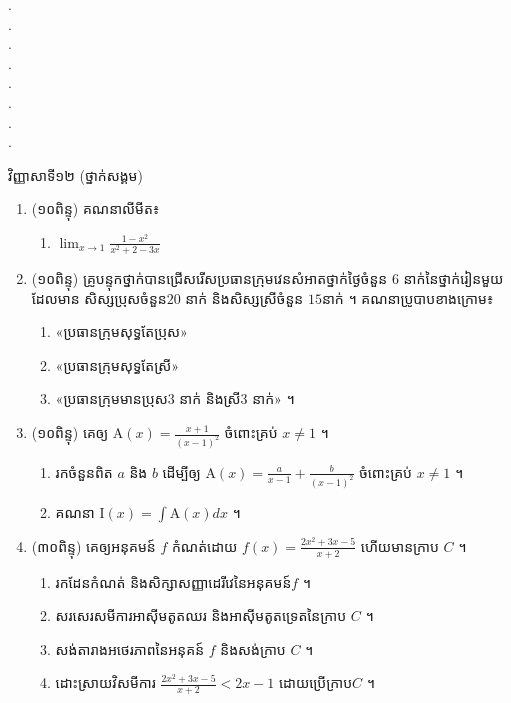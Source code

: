 \documentclass{officialexam}
\begin{document}
{\color{white}.}\dotfill
\\
{\color{white}.}\dotfill\\
{\color{white}.}\dotfill\\
{\color{white}.}\dotfill
\\
{\color{white}.}\dotfill\\
{\color{white}.}\dotfill\\
{\color{white}.}\dotfill
\\
{\color{white}.}\dotfill 
\newpage 
\maketitle 
\begin{center}
\kml
  វិញ្ញាសាទី១២ ({\kn ថ្នាក់សង្គម})\\
  \end{center}
    
    \begin{enumerate}[I]
\item (១០ពិន្ទុ)  គណនាលីមីត៖

\begin{enumerate}[k,2]

\item   $\lim_{x\to 1}\frac{1-x^2}{x^2+2-3x}$
\end{enumerate}


\item (១០ពិន្ទុ)   គ្រូបន្ទុកថ្នាក់បានជ្រើសរើសប្រធានក្រុមវេនសំអាតថ្នាក់ថ្ងៃចំនួន $6$ នាក់នៃថ្នាក់រៀនមួយដែលមាន សិស្សប្រុសចំនួន$20$ នាក់ និងសិស្សស្រីចំនួន $15$នាក់ ។ គណនាប្រូបាបខាងក្រោម៖ 
\begin{enumerate}[A]
\item «ប្រធានក្រុមសុទ្ធតែប្រុស»
\item «ប្រធានក្រុមសុទ្ធតែស្រី»
\item «ប្រធានក្រុមមានប្រុស$3$ នាក់ និងស្រី$3$ នាក់» ។
\end{enumerate}
\item (១០ពិន្ទុ)  គេឲ្យ $\mathrm{A}(x)=\frac{x+1}{(x-1)^2}$ ចំពោះគ្រប់ $x\neq 1$ ។
\begin{enumerate}[k]
\item រកចំនួនពិត $a$ និង $b$ ដើម្បីឲ្យ $\mathrm{A}(x)=\frac{a}{x-1}+\frac{b}{(x-1)^2}$ ចំពោះគ្រប់ $x\neq 1$ ។
\item គណនា $\mathrm{I}(x)=\int\mathrm{A}(x)dx$ ។
\end{enumerate}


\item (៣០ពិន្ទុ) គេឲ្យអនុគមន៍ $f$ កំណត់ដោយ $f(x)=\frac{2x^2+3x-5}{x+2}$ ហើយមានក្រាប $C$ ។ 
\begin{enumerate}[k]
\item រកដែនកំណត់ និងសិក្សាសញ្ញាដេរីវេនៃអនុគមន៍$f$ ។
\item សរសេរសមីការអាស៊ីមតូតឈរ និងអាស៊ីមតូតទ្រេតនៃក្រាប $C$ ។
\item សង់តារាងអថេរភាពនៃអនុគន៍ $f$ និងសង់ក្រាប $C$ ។
\item ដោះស្រាយវិសមីការ $\frac{2x^2+3x-5}{x+2}<2x-1$ ដោយប្រើក្រាប$C$ ។
\end{enumerate}
\end{enumerate}
\end{document}
